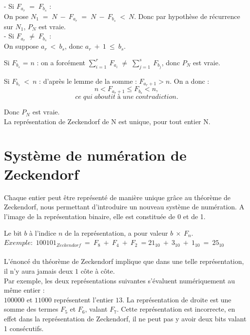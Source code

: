 \documentclass{article}
\begin{document}
- Si $F_{a_r} \; = \; F_{b_s}$ : \\

On pose $N_1 \; = \; N \: - \: F_{a_r} \; = \; N \: - \: F_{b_s} \; < \: N$. Donc par hypothèse de récurrence sur $N_1$, \; $P_{N}$ est vraie.\\

- Si $F_{a_r} \; \ne \; F_{b_s}$ : \\

On suppose $a_r \: < \: b_s$, donc $a_r \:+ \:1 \: \leq \: b_s$.

Si $F_{b_s}$ = $n$ : on a forcément $\sum_{i=1}^r \: F_{a_i} \; \ne \; \sum_{j=1}^s \: F_{b_j}$, donc $P_N$ est vraie.

Si $F_{b_s}\:<\:n$ : d'après le lemme de la somme :
$F_{a_r +1}>n$. On a donc :
\[ n < F_{a_r + 1} \leq F_{b_s} < n ,\]
\[ce \; qui \; aboutit \; à \; une\; contradiction.\]



Donc $P_N$ est vraie.\\

La représentation de Zeckendorf de N est unique, pour tout entier N.


\section{Système de numération de Zeckendorf}

Chaque entier peut être représenté de manière unique grâce au théorème de Zeckendorf, nous permettant d'introduire un nouveau système de numération. A l'image de la représentation binaire, elle est constituée de 0 et de 1. 

Le bit $b$ à l'indice $n$ de la représentation, a pour valeur $b \: \times \: F_n$. \\

$Exemple :$ $100101_{Zeckendorf} \: = \: F_8 \: + \:  F_4 \: + \: F_2 \: = 21_{10} \: + \: 3_{10} \: + \: 1_{10} \: = \: 25_{10}$\\\\
L'énoncé du théorème de Zeckendorf implique que dans une telle représentation, il n'y aura jamais deux $1$ côte à côte.\\

Par exemple, les deux représentations suivantes s'évaluent numériquement au même entier :\\

$100000$ et $11000$ représentent l'entier $13$. La représentation de droite est une somme des termes $F_5$ et $F_6$, valant $F_7$. Cette représentation est incorrecte, en effet dans la représentation de Zeckendorf, il ne peut pas y avoir deux bits valant 1 consécutifs.\\
\end{document}

